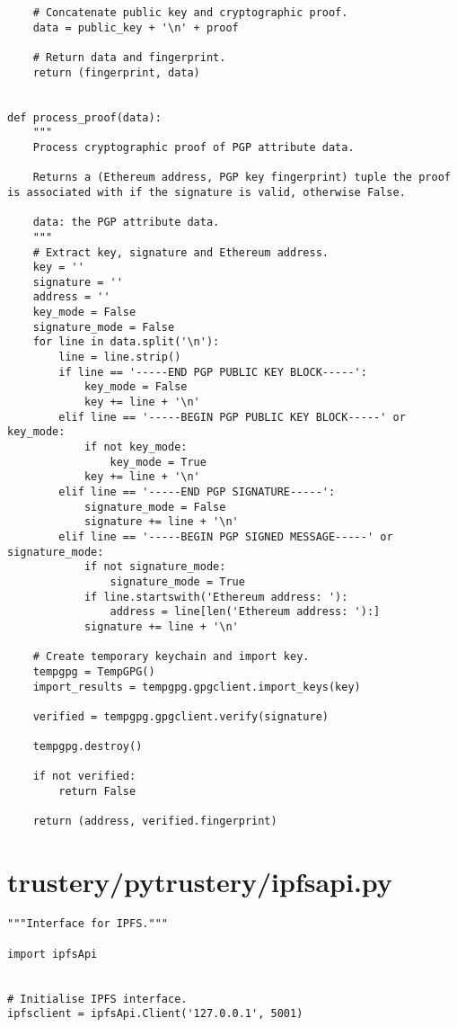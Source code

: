 \documentclass[12pt]{report}
\begin{document}
\begin{lstlisting}
    # Concatenate public key and cryptographic proof.
    data = public_key + '\n' + proof

    # Return data and fingerprint.
    return (fingerprint, data)


def process_proof(data):
    """
    Process cryptographic proof of PGP attribute data.

    Returns a (Ethereum address, PGP key fingerprint) tuple the proof is associated with if the signature is valid, otherwise False.

    data: the PGP attribute data.
    """
    # Extract key, signature and Ethereum address.
    key = ''
    signature = ''
    address = ''
    key_mode = False
    signature_mode = False
    for line in data.split('\n'):
        line = line.strip()
        if line == '-----END PGP PUBLIC KEY BLOCK-----':
            key_mode = False
            key += line + '\n'
        elif line == '-----BEGIN PGP PUBLIC KEY BLOCK-----' or key_mode:
            if not key_mode:
                key_mode = True
            key += line + '\n'
        elif line == '-----END PGP SIGNATURE-----':
            signature_mode = False
            signature += line + '\n'
        elif line == '-----BEGIN PGP SIGNED MESSAGE-----' or signature_mode:
            if not signature_mode:
                signature_mode = True
            if line.startswith('Ethereum address: '):
                address = line[len('Ethereum address: '):]
            signature += line + '\n'

    # Create temporary keychain and import key.
    tempgpg = TempGPG()
    import_results = tempgpg.gpgclient.import_keys(key)

    verified = tempgpg.gpgclient.verify(signature)

    tempgpg.destroy()

    if not verified:
        return False

    return (address, verified.fingerprint)
	\end{lstlisting}
	
	\section{trustery/pytrustery/ipfsapi.py}
	\begin{lstlisting}
"""Interface for IPFS."""

import ipfsApi


# Initialise IPFS interface.
ipfsclient = ipfsApi.Client('127.0.0.1', 5001)
	\end{lstlisting}
	
\end{document}
